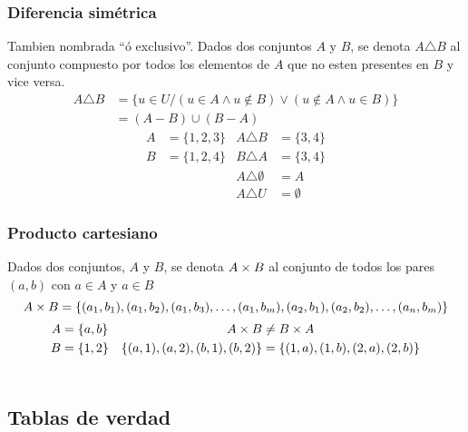 \documentclass[../teoria.root.tex]{subfiles}
\begin{document}
\subsubsection{Diferencia simétrica}
Tambien nombrada ``ó exclusivo''. Dados dos conjuntos $A$ y $B$, se denota $A \triangle B$
al conjunto compuesto por todos los elementos de $A$ que no esten presentes en $B$ y vice versa.
\begin{align*}
    A \triangle B & = \{u \in U / (u \in A \land u \notin B) \lor (u \notin A \land u \in B) \} \\
                  & = (A - B) \cup (B - A)
\end{align*}
\begin{align*}
    A & = \{1, 2, 3\} & A \triangle B         & = \{3, 4\}  \\
    B & = \{1, 2, 4\} & B \triangle A         & = \{3, 4\}  \\
      &               & A \triangle \emptyset & = A         \\
      &               & A \triangle U         & = \emptyset
\end{align*}
\subsubsection{Producto cartesiano}
Dados dos conjuntos, $A$ y $B$, se denota $A \times B$ al conjunto de todos los pares $(a, b)$ con $a \in A$ y $a \in B$
\[ A \times B = \{(a_1, b_1), (a_1, b_2), (a_1, b_3), \dots, (a_1, b_m), (a_2, b_1), (a_2, b_2), \dots, (a_n, b_m)\} \]
\begin{align*}
    A & = \{a, b\} & A \times B                             & \neq B \times A                          \\
    B & = \{1, 2\} & \{(a, 1), (a, 2), (b, 1), (b, 2)\} & = \{(1, a), (1, b), (2, a), (2, b)\} \\
      &            &
\end{align*}

\subsection{Tablas de verdad}
\end{document}
